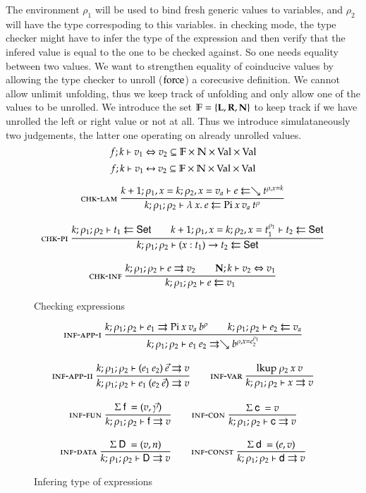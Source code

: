 The environment $\rho_1$ will be used to bind fresh generic values to variables, and $\rho_2$ will have the type correspoding to this variables. in checking mode, the type checker might have to infer the type of the expression and then verify that the infered value is equal to the one to be checked against.
So one needs equality between two values.
We want to strengthen equality of coinducive values by allowing the type checker to unroll ($\mathrm{force}$) a corecusive definition. We cannot allow unlimit unfolding, thus we keep track of unfolding and only allow one of the values to be unrolled.
We introduce the set $ \mathbb{F} = \{\mathbf{L}, \mathbf{R}, \mathbf{N} \} $ to keep track if we have unrolled the left or right value or not at all.
Thus we introduce simulataneously two judgements, the latter one operating on already unrolled values.
\[f;k\vdash v_1\Leftrightarrow v_2 \subseteq \mathbb{F} \times \mathbb{N} \times \mathrm{Val} \times \mathrm{Val} \]
\[f;k\vdash v_1{\:\leftrightarrow\:}v_2 \subseteq \mathbb{F} \times \mathbb{N} \times\mathrm{Val} \times \mathrm{Val} \]

\begin{figure}[p]

\begin{gather*}
\mbox{\sc chk-lam}\ \dfrac{k+1;\rho_1,x=k;\rho_2,x=v_a\vdash e\leftleftarrows\searrow t^{\rho,x=k}}{k;\rho_1;\rho_2\vdash\lambda\: x .\:{e}\leftleftarrows\mathrm{Pi} \: x \: v_a \: t^{\rho}}
\\[2ex]
\mbox{\sc chk-pi}\ \dfrac{k;\rho_1;\rho_2\vdash t_1\leftleftarrows\mathsf{Set}
\qquad
k+1;\rho_1,x=k;\rho_2,x=t_1^{\rho_1}\vdash t_2\leftleftarrows\mathsf{Set}
}{k;\rho_1;\rho_2\vdash( x : t_1 ) \rightarrow{t_2}\leftleftarrows\mathsf{Set}}
\\[2ex]
\mbox{\sc chk-inf}\ \dfrac{k;\rho_1;\rho_2\vdash e\rightrightarrows v_2
\qquad
{\mathbf{N};k\vdash v_2\Leftrightarrow v_1}}{k;\rho_1;\rho_2\vdash e\leftleftarrows v_1}
\end{gather*}
\caption{Checking expressions}
\end{figure}

\begin{figure}[p]
\begin{gather*}
\mbox{\sc inf-app-i}\ \dfrac{k;\rho_1;\rho_2\vdash e_1\rightrightarrows\mathrm{Pi} \: x \: v_a \: b^{\rho}
\qquad k;\rho_1;\rho_2\vdash e_2\leftleftarrows v_a}{k;\rho_1;\rho_2\vdash e_1 \: e_2\rightrightarrows\searrow b^{\rho,x=e_2^{\rho_1}}}
\\[2ex]
\mbox{\sc inf-app-ii}\ \dfrac{k;\rho_1;\rho_2\vdash(e_1 \: e_2)\:\vec{e}\rightrightarrows v}{k;\rho_1;\rho_2\vdash e_1 \: (e_2 \: \vec{e})\rightrightarrows v}
\qquad
\mbox{\sc inf-var}\ \dfrac{\mathrm{lkup} \: \rho_2 \: x \: v}{k;\rho_1;\rho_2\vdash x\rightrightarrows v}
\\[2ex]
\mbox{\sc inf-fun}\ \dfrac{\mathrm{\Sigma} \: \mathsf{f} \: = (v,\vec{\gamma}) }{k;\rho_1;\rho_2\vdash\mathsf{f}\rightrightarrows v}
\qquad
\mbox{\sc inf-con}\ \dfrac{\mathrm{\Sigma} \: \mathsf{c} \: = v}{k;\rho_1;\rho_2\vdash\mathsf{c}\rightrightarrows v}
\\[2ex] 
\mbox{\sc inf-data}\ \dfrac{\mathrm{\Sigma} \: \mathsf{D} \: = (v,n)}{k;\rho_1;\rho_2\vdash\mathsf{D}\rightrightarrows v} 
\qquad
\mbox{\sc inf-const}\ \dfrac{\mathrm{\Sigma} \: \mathsf{d} \: = (e,v)}{k;\rho_1;\rho_2\vdash\mathsf{d}\rightrightarrows v}
\end{gather*}
\caption{Infering type of expressions}
\end{figure}

